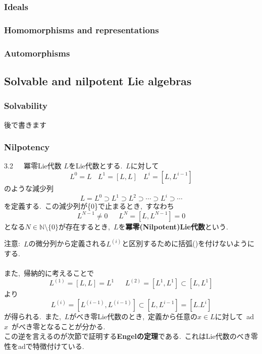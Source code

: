 \documentclass[uplatex,dvipdfmx]{jsarticle}
\begin{document}
\subsubsection{Ideals}
\subsubsection{Homomorphisms and representations}
\subsubsection{Automorphisms}
\subsection{Solvable and nilpotent Lie algebras}
\subsubsection{Solvability}
後で書きます\newpage
\subsubsection{Nilpotency}
\begin{mydef}{3.2~~~冪零Lie代数}
    $L$をLie代数とする.~$L$に対して
    \begin{equation*}
        L^0 = L ~~~~L^1=[L,L]~~~~L^i=[L,L^{i-1}]
    \end{equation*}
    のような減少列
    \begin{equation*}
        L=L^0 \supset L^1 \supset L^2 \supset \cdots \supset L^i \supset \cdots
    \end{equation*}
    を定義する.~この減少列が\{0\}で止まるとき,~すなわち
    \begin{equation*}
        L^{N-1} \neq 0~~~~~~~  L^N=[L,L^{N-1}]=0
    \end{equation*}
    となる$N\in \mathbb{N}\setminus \{0\}$が存在するとき,~$L$を\textbf{冪零(Nilpotent)Lie代数}という.
\end{mydef}
注意:~$L$の微分列から定義される$L^{(i)}$と区別するために括弧()を付けないようにする.\\\\
また,~帰納的に考えることで
\begin{equation*}
    L^{(1)}=[L,L]=L^1~~~~~~~L^{(2)}=[L^1,L^1]\subset [L,L^1]
\end{equation*}
より
\begin{equation*}
    L^{(i)}=[L^{(i-1)},L^{(i-1)}]\subset [L,L^{i-1}]=[L.L^i]
\end{equation*}
が得られる.~また,~$L$がべき零Lie代数のとき,~定義から任意の$x\in L$に対して~ad $x$~がべき零となることが分かる.\\
この逆を言えるのが次節で証明する\textbf{Engelの定理}である.~これはLie代数のべき零性をadで特徴付けている.
\end{document}
